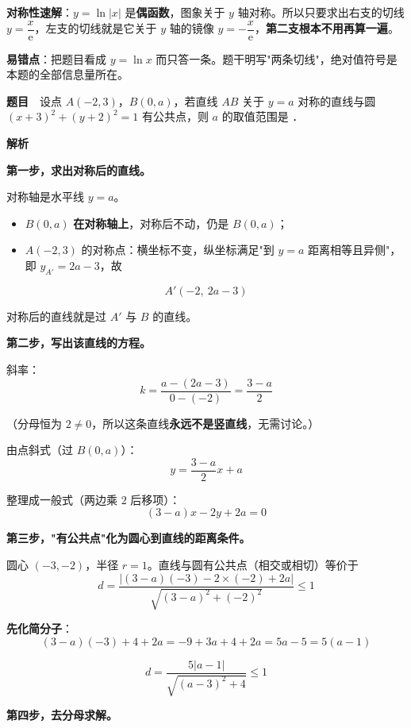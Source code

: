 
\begin{gktip}
\textbf{对称性速解}：$y=\ln|x|$ 是\textbf{偶函数}，图象关于 $y$ 轴对称。所以只要求出右支的切线 $y=\dfrac x{\mathrm e}$，左支的切线就是它关于 $y$ 轴的镜像 $y=-\dfrac x{\mathrm e}$，\textbf{第二支根本不用再算一遍}。

\textbf{易错点}：把题目看成 $y=\ln x$ 而只答一条。题干明写"两条切线"，绝对值符号是本题的全部信息量所在。
\end{gktip}

\par\medskip


\textbf{题目}　设点 $A(-2,3)$，$B(0,a)$，若直线 $AB$ 关于 $y=a$ 对称的直线与圆 $(x+3)^{2}+(y+2)^{2}=1$ 有公共点，则 $a$ 的取值范围是 \gkblank{}．

\textbf{解析}

\textbf{第一步，求出对称后的直线。}

对称轴是水平线 $y=a$。

\begin{itemize}
\item $B(0,a)$ \textbf{在对称轴上}，对称后不动，仍是 $B(0,a)$；
\item $A(-2,3)$ 的对称点：横坐标不变，纵坐标满足"到 $y=a$ 距离相等且异侧"，即 $y_{A'}=2a-3$，故
\end{itemize}
\[A'(-2,\ 2a-3)\]

对称后的直线就是过 $A'$ 与 $B$ 的直线。

\textbf{第二步，写出该直线的方程。}

斜率：
\[k=\frac{a-(2a-3)}{0-(-2)}=\frac{3-a}2\]

（分母恒为 $2\ne0$，所以这条直线\textbf{永远不是竖直线}，无需讨论。）

由点斜式（过 $B(0,a)$）：
\[y=\frac{3-a}2x+a\]

整理成一般式（两边乘 $2$ 后移项）：
\[(3-a)x-2y+2a=0\]

\textbf{第三步，"有公共点"化为圆心到直线的距离条件。}

圆心 $(-3,-2)$，半径 $r=1$。直线与圆有公共点（相交或相切）等价于
\[d=\frac{|(3-a)(-3)-2\times(-2)+2a|}{\sqrt{(3-a)^{2}+(-2)^{2}}}\le1\]

\textbf{先化简分子}：
\[(3-a)(-3)+4+2a=-9+3a+4+2a=5a-5=5(a-1)\]

\[d=\frac{5|a-1|}{\sqrt{(a-3)^{2}+4}}\le1\]

\textbf{第四步，去分母求解。}


